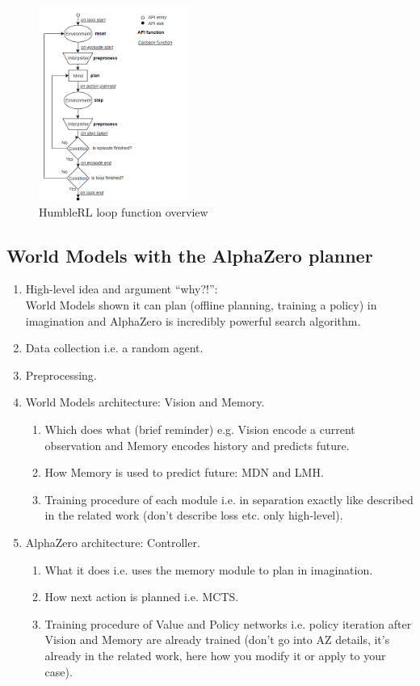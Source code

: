 \begin{figure}[H]
\includegraphics[width=0.45\textwidth,height=0.9\textheight,keepaspectratio]{figures/HumbleRL/loop.png}
\caption{HumbleRL loop function overview}
\label{Fig.HRL_loop}
\end{figure}

\subsection{World Models with the AlphaZero planner}

\begin{enumerate}
\item High-level idea and argument ``why?!'':\\
  World Models shown it can plan (offline planning, training a policy) in imagination and AlphaZero is incredibly powerful search algorithm.
\item Data collection i.e. a random agent.
\item Preprocessing.
\item World Models architecture: Vision and Memory.
  \begin{enumerate}
  \item Which does what (brief reminder) e.g. Vision encode a current observation and Memory encodes history and predicts future.
  \item How Memory is used to predict future: MDN and LMH.
  \item Training procedure of each module i.e. in separation exactly like described in the related work (don't describe loss etc. only high-level).
  \end{enumerate}
\item AlphaZero architecture: Controller.
  \begin{enumerate}
  \item What it does i.e. uses the memory module to plan in imagination.
  \item How next action is planned i.e. MCTS.
  \item Training procedure of Value and Policy networks i.e. policy iteration after Vision and Memory are already trained (don't go into AZ details, it's already in the related work, here how you modify it or apply to your case).
  \end{enumerate}
\end{enumerate}


